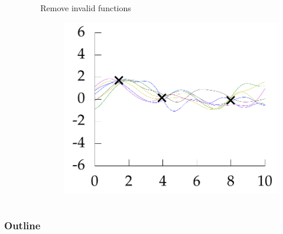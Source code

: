 \documentclass[10pt]{beamer}
\begin{document}
\begin{frame}
\begin{columns}
\begin{column}{0.33\textwidth}
\begin{figure}
        \end{figure}
      \end{column}
      \pause
      \begin{column}{0.33\textwidth}
        Remove invalid functions
        \begin{figure}
          \centering
          \includegraphics[width=\textwidth]{func3.png}
        \end{figure}
      \end{column}
    \end{columns}
  \end{frame}

  \begin{frame}[noframenumbering]
    \frametitle{Outline}
    \tableofcontents
  \end{frame}
\end{document}
